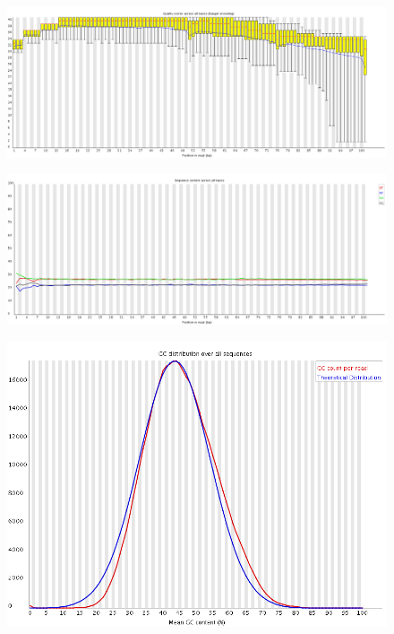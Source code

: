 \documentclass{article}
\begin{document}
    \begin{figure}[htbp]
      \centering
      \includegraphics[width=1.0\linewidth] {fastqc/2_120719_BD158KACXX_1_nophix-sort-dup_fastqc/Images/per_base_quality.png}
      \caption{}
    \end{figure}
    \begin{figure}[htbp]
      \centering
      \includegraphics[width=0.85\linewidth] {fastqc/2_120719_BD158KACXX_1_nophix-sort-dup_fastqc/Images/per_base_sequence_content.png}
      \caption{}
    \end{figure}
    \begin{figure}[htbp]
      \centering
      \includegraphics[width=0.85\linewidth] {fastqc/2_120719_BD158KACXX_1_nophix-sort-dup_fastqc/Images/per_sequence_gc_content.png}
      \caption{}
    \end{figure}
\end{document}

